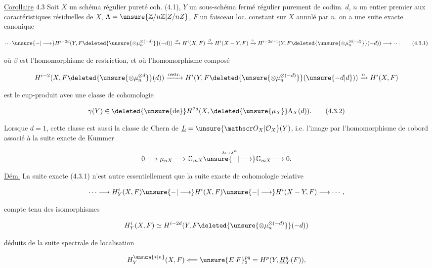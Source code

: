 \uline{Corollaire} 4.3 Soit $X$ un schéma  régulier   pureté coh. (4.1), $Y$ un sous-schéma fermé régulier purement de codim. $d$, $n$ un entier premier aux caractéristiques résiduelles de $X$, $\Lambda=\unsure{\mathbb Z/n\mathbb Z|Z/nZ}$, $F$ un faisceau loc. constant sur $X$ annulé par $n$.
 on a une suite exacte canonique

\[
\cdots\unsure{{-}|\longrightarrow}H^{i-2d}(Y,F\deleted{\unsure{\otimes\mu_n^{\otimes(-d)}}}(-d))
\xrightarrow{\alpha}H^i(X,F)\xrightarrow{\beta}H^i(X-Y,F)
\xrightarrow{\gamma}H^{i-2d+1}(Y,F\deleted{\unsure{\otimes\mu_n^{\otimes(-d)}}}(-d))\longrightarrow\cdots
\tag*{(4.3.1)}
\]

où $\beta$ est l'homomorphisme de restriction, et où l'homomorphisme composé

\[
H^{i-2}(X,F\deleted{\unsure{\otimes\mu_n^{\otimes d}}}(d))
\xrightarrow{\text{restr.}}H^i(Y,F\deleted{\unsure{\otimes\mu_n^{\otimes(-d)}}}(\unsure{-d|d}))
\xrightarrow{\alpha}H^i(X,F)
\]

est le cup-produit avec une classe de cohomologie  

\[
\gamma(Y)\in\deleted{\unsure{\text{de}}}H^{2d}(X,\deleted{\unsure{\mu_X}}\Lambda_X(d)).
\tag*{(4.3.2)}
\]

 Lorsque $d=1$,  cette classe est aussi la  classe de Chern de $\underline L=\unsure{\mathscr O_X|\mathcal O_X}(Y)$, i.e. l'image  par l'homomorphisme  de cobord associé à la suite exacte de Kummer

\[
0\longrightarrow\mu_{nX}\longrightarrow\mathbb G_{mX}\overset{\lambda\mapsto\lambda^n}{\unsure{{-}|\longrightarrow}}\mathbb G_{mX}\longrightarrow 0.
\]

\uline{Dém.} La suite exacte (4.3.1) n'est autre essentiellement que la suite exacte de cohomologie relative

\[
\cdots\longrightarrow H^i_Y(X,F)\unsure{{-}|\longrightarrow}H^i(X,F)\unsure{{-}|\longrightarrow}H^i(X-Y,F)\longrightarrow\cdots,
\]

compte tenu des isomorphismes

\[
H^i_Y(X,F)\simeq H^{i-2d}(Y,F\deleted{\unsure{\otimes\mu_n^{\otimes(-d)}}}(-d))
\]

déduits de la suite spectrale de localisation

\[
H^{\unsure{*|n}}_Y(X,F)\Longleftarrow\unsure{E|F}^{pq}_2=H^p(Y,\underline H^q_Y(F)),
\]

